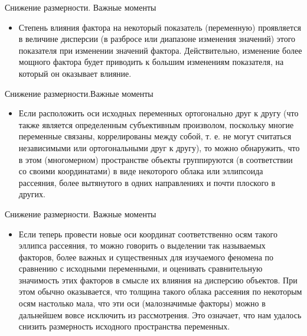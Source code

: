 \documentclass{beamer}
\begin{document}
   
\begin{frame}{Снижение размерности. Важные моменты}
\begin{itemize}
  
  
  \item Степень влияния фактора на некоторый показатель (переменную) проявляется в величине дисперсии (в разбросе или диапазоне изменения значений) этого показателя при 
  изменении значений фактора.    Действительно, изменение более мощного фактора будет приводить к большим изменениям показателя, на который он оказывает влияние.

\end{itemize} 
 \end{frame}
 
   
\begin{frame}{Снижение размерности.Важные моменты}
\begin{itemize}

  
  \item Если расположить оси исходных переменных ортогонально друг к другу (что также является определенным субъективным произволом, поскольку многие переменные связаны, коррелированы между собой, т. е. не могут считаться независимыми или ортогональными друг к другу), то можно обнаружить, что в этом (многомерном) пространстве объекты группируются (в соответствии со своими координатами) в виде некоторого облака или эллипсоида рассеяния, более вытянутого в одних направлениях и почти плоского в других.
  
  \end{itemize} 
 \end{frame}
 
   
\begin{frame}{Снижение размерности. Важные моменты}
\begin{itemize}

   \item   Если теперь провести новые оси координат соответственно осям такого эллипса рассеяния, то можно говорить о выделении так называемых факторов, более важных и существенных для изучаемого феномена по сравнению с исходными переменными, и оценивать сравнительную значимость этих факторов в смысле их влияния на дисперсию объектов. При этом обычно оказывается, что толщина такого облака рассеяния по некоторым осям настолько мала, что эти оси (малозначимые факторы) можно в дальнейшем вовсе исключить из рассмотрения. Это означает, что нам удалось снизить размерность исходного пространства переменных.  

\end{itemize} 
 \end{frame}
 
\end{document}
